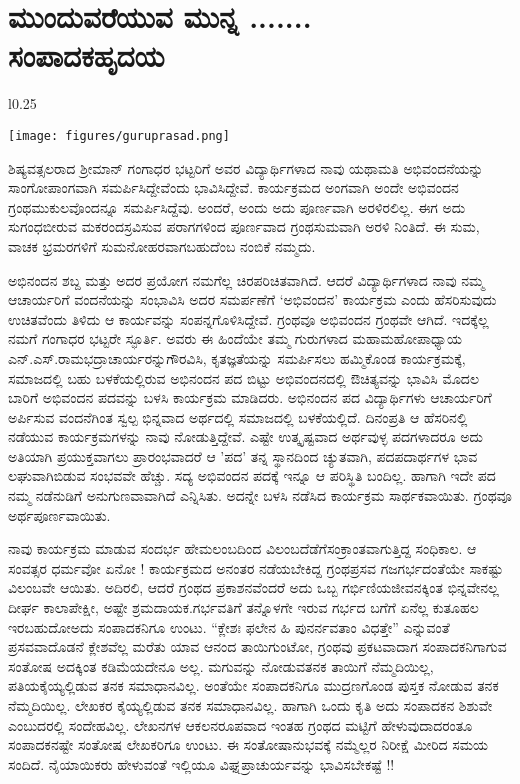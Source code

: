 {\fontsize{14}{16}\selectfont

\chapter[ಮುಂದುವರೆಯುವ ಮುನ್ನ .......ಸಂಪಾದಕ\enginline{-}ಹೃದಯ]{\qquad ಮುಂದುವರೆಯುವ ಮುನ್ನ .......\\ \qquad  ಸಂಪಾದಕ\enginline{-}ಹೃದಯ}

\begin{wrapfigure}{l}{0.25\textwidth}
\centerline{\texttt{[image: figures/guruprasad.png]}}
\end{wrapfigure}

 
ಶಿಷ್ಯವತ್ಸಲರಾದ ಶ್ರೀಮಾನ್ ಗಂಗಾಧರ ಭಟ್ಟರಿಗೆ ಅವರ ವಿದ್ಯಾರ್ಥಿಗಳಾದ ನಾವು ಯಥಾಮತಿ ಅಭಿವಂದನೆಯನ್ನು ಸಾಂಗೋಪಾಂಗವಾಗಿ ಸಮರ್ಪಿಸಿದ್ದೇವೆಂದು ಭಾವಿಸಿದ್ದೇವೆ. ಕಾರ್ಯಕ್ರಮದ ಅಂಗವಾಗಿ ಅಂದೇ ಅಭಿವಂದನ ಗ್ರಂಥಮುಕುಲವೊಂದನ್ನೂ ಸಮರ್ಪಿಸಿದ್ದೆವು. ಅಂದರೆ, ಅಂದು ಅದು ಪೂರ್ಣವಾಗಿ ಅರಳಿರಲಿಲ್ಲ. ಈಗ ಅದು ಸುಗಂಧ\break ಬೀರುವ ಮಕರಂದಸ್ರವಿಸುವ ಪರಾಗಗಳಿಂದ ಪೂರ್ಣವಾದ ಗ್ರಂಥಸುಮವಾಗಿ ಅರಳಿ ನಿಂತಿದೆ. ಈ ಸುಮ, ವಾಚಕ ಭ್ರಮರಗಳಿಗೆ ಸುಮನೋಹರವಾಗಬಹುದೆಂಬ ನಂಬಿಕೆ ನಮ್ಮದು.

ಅಭಿನಂದನ ಶಬ್ದ ಮತ್ತು ಅದರ ಪ್ರಯೋಗ ನಮಗೆಲ್ಲ ಚಿರಪರಿಚಿತವಾಗಿದೆ. ಆದರೆ ವಿದ್ಯಾರ್ಥಿಗಳಾದ ನಾವು ನಮ್ಮ ಆಚಾರ್ಯರಿಗೆ ವಂದನೆಯನ್ನು ಸಂಭಾವಿಸಿ ಅದರ \break ಸಮರ್ಪಣೆಗೆ ‘ಅಭಿವಂದನ’ ಕಾರ್ಯಕ್ರಮ ಎಂದು ಹೆಸರಿಸುವುದು ಉಚಿತವೆಂದು ತಿಳಿದು ಆ ಕಾರ್ಯವನ್ನು ಸಂಪನ್ನಗೊಳಿಸಿದ್ದೇವೆ. ಗ್ರಂಥವೂ ಅಭಿವಂದನ ಗ್ರಂಥವೇ ಆಗಿದೆ. ಇದಕ್ಕೆಲ್ಲ ನಮಗೆ ಗಂಗಾಧರ ಭಟ್ಟರೇ ಸ್ಫೂರ್ತಿ. ಅವರು ಈ ಹಿಂದೆಯೇ ತಮ್ಮ ಗುರುಗಳಾದ ಮಹಾಮಹೋಪಾಧ್ಯಾಯ ಎನ್.ಎಸ್.ರಾಮಭದ್ರಾಚಾರ್ಯರನ್ನು\break ಗೌರವಿಸಿ, ಕೃತಜ್ಞತೆಯನ್ನು ಸಮರ್ಪಿಸಲು ಹಮ್ಮಿಕೊಂಡ ಕಾರ್ಯಕ್ರಮಕ್ಕೆ, ಸಮಾಜದಲ್ಲಿ ಬಹು  ಬಳಕೆಯಲ್ಲಿರುವ ಅಭಿನಂದನ ಪದ ಬಿಟ್ಟು ಅಭಿವಂದನದಲ್ಲಿ \hbox{ಔಚಿತ್ಯವನ್ನು} ಭಾವಿಸಿ ಮೊದಲ ಬಾರಿಗೆ ಅಭಿವಂದನ ಪದವನ್ನು ಬಳಸಿ ಕಾರ್ಯಕ್ರಮ ಮಾಡಿದರು. \hbox{ಅಭಿನಂದನ} ಪದ ವಿದ್ಯಾರ್ಥಿಗಳು ಆಚಾರ್ಯರಿಗೆ ಅರ್ಪಿಸುವ ವಂದನೆಗಿಂತ ಸ್ವಲ್ಪ \hbox{ಭಿನ್ನವಾದ} ಅರ್ಥದಲ್ಲಿ ಸಮಾಜದಲ್ಲಿ ಬಳಕೆಯಲ್ಲಿದೆ. ದಿನಂಪ್ರತಿ ಆ ಹೆಸರಿನಲ್ಲಿ ನಡೆಯುವ ಕಾರ್ಯಕ್ರಮಗಳನ್ನು ನಾವು ನೋಡುತ್ತಿದ್ದೇವೆ. ಎಷ್ಟೇ ಉತ್ಕೃಷ್ಟವಾದ ಅರ್ಥವುಳ್ಳ ಪದಗಳಾದರೂ ಅದು ಅತಿಯಾಗಿ ಪ್ರಯುಕ್ತವಾಗಲು ಪ್ರಾರಂಭವಾದರೆ ಆ ’ಪದ’ ತನ್ನ ಸ್ಥಾನದಿಂದ ಚ್ಯುತವಾಗಿ, ಪದ\enginline{-}ಪದಾರ್ಥಗಳ ಭಾವ ಲಘುವಾಗಿಬಿಡುವ ಸಂಭವವೇ ಹೆಚ್ಚು. ಸದ್ಯ ಅಭಿವಂದನ ಪದಕ್ಕೆ ಇನ್ನೂ ಆ ಪರಿಸ್ಥಿತಿ ಬಂದಿಲ್ಲ. ಹಾಗಾಗಿ ಇದೇ ಪದ ನಮ್ಮ ನಡೆನುಡಿಗೆ ಅನುಗುಣವಾವಾಗಿದೆ ಎನ್ನಿಸಿತು. ಅದನ್ನೇ ಬಳಸಿ ನಡೆಸಿದ ಕಾರ್ಯಕ್ರಮ ಸಾರ್ಥಕವಾಯಿತು. ಗ್ರಂಥವೂ ಅರ್ಥಪೂರ್ಣವಾಯಿತು.

ನಾವು ಕಾರ್ಯಕ್ರಮ ಮಾಡುವ ಸಂದರ್ಭ ಹೇಮಲಂಬದಿಂದ ವಿಲಂಬದೆಡೆಗೆ\break ಸಂಕ್ರಾಂತವಾಗುತ್ತಿದ್ದ ಸಂಧಿಕಾಲ. ಆ ಸಂವತ್ಸರ ಧರ್ಮವೋ ಏನೋ ! ಕಾರ್ಯಕ್ರಮದ ಅನಂತರ ನಡೆಯಬೇಕಿದ್ದ ಗ್ರಂಥಪ್ರಸವ ಗಜಗರ್ಭದಂತೆಯೇ ಸಾಕಷ್ಟು ವಿಲಂಬವೇ ಆಯಿತು. ಅದಿರಲಿ, ಆದರೆ ಗ್ರಂಥದ ಪ್ರಕಾಶನವೆಂದರೆ ಅದು ಒಬ್ಬ ಗರ್ಭಿಣಿಯ\break ಜೀವನಕ್ಕಿಂತ ಭಿನ್ನವೇನಲ್ಲ \enginline{-} ದೀರ್ಘ ಕಾಲಾಪೇಕ್ಷೀ, ಅಷ್ಟೇ ಶ್ರಮದಾಯಕ.\break ಗರ್ಭವತಿಗೆ ತನ್ನೊಳಗೇ ಇರುವ ಗರ್ಭದ ಬಗೆಗೆ ಏನೆಲ್ಲ ಕುತೂಹಲ ಇರಬಹುದೋ\break ಅದು ಸಂಪಾದಕನಿಗೂ ಉಂಟು. “ಕ್ಲೇಶಃ ಫಲೇನ ಹಿ ಪುನರ್ನವತಾಂ ವಿಧತ್ತೇ” ಎನ್ನುವಂತೆ ಪ್ರಸವವಾದೊಡನೆ ಕ್ಲೇಶವೆಲ್ಲ ಮರೆತು ಯಾವ ಆನಂದ \hbox{ತಾಯಿಗುಂಟೋ,} ಗ್ರಂಥವು ಪ್ರಕಟವಾದಾಗ ಸಂಪಾದಕನಿಗಾಗುವ ಸಂತೋಷ ಅದಕ್ಕಿಂತ ಕಡಿಮೆಯದೇನೂ ಅಲ್ಲ. ಮಗುವನ್ನು ನೋಡುವತನಕ ತಾಯಿಗೆ ನೆಮ್ಮದಿಯಿಲ್ಲ, ಪತಿಯ\break ಕೈಯ್ಯಲ್ಲಿಡುವ ತನಕ ಸಮಾಧಾನವಿಲ್ಲ.  ಅಂತೆಯೇ ಸಂಪಾದಕನಿಗೂ ಮುದ್ರಣಗೊಂಡ ಪುಸ್ತಕ ನೋಡುವ ತನಕ ನೆಮ್ಮದಿಯಿಲ್ಲ. ಲೇಖಕರ ಕೈಯ್ಯಲ್ಲಿಡುವ ತನಕ \hbox{ಸಮಾಧಾನವಿಲ್ಲ.} ಹಾಗಾಗಿ ಒಂದು ಕೃತಿ ಅದು ಸಂಪಾದಕನ ಶಿಶುವೇ ಎಂಬುದರಲ್ಲಿ ಸಂದೇಹವಿಲ್ಲ. ಲೇಖನಗಳ ಆಕಲನರೂಪವಾದ ಇಂತಹ ಗ್ರಂಥದ ಮಟ್ಟಿಗೆ ಹೇಳುವುದಾದರಂತೂ  ಸಂಪಾದಕನಷ್ಟೇ ಸಂತೋಷ ಲೇಖಕರಿಗೂ ಉಂಟು. ಈ ಸಂತೋಷಾನುಭವಕ್ಕೆ ನಮ್ಮೆಲ್ಲರ ನಿರೀಕ್ಷೆ ಮೀರಿದ ಸಮಯ ಸಂದಿದೆ. ನೈಯಾಯಿಕರು ಹೇಳುವಂತೆ ಇಲ್ಲಿಯೂ ವಿಘ್ನಪ್ರಾಚುರ್ಯವನ್ನು ಭಾವಿಸಬೇಕಷ್ಟೆ !!


}
